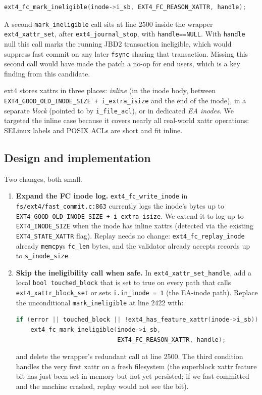 \documentclass[11pt,a4paper]{article}
\begin{document}
\begin{lstlisting}[language=C]
ext4_fc_mark_ineligible(inode->i_sb, EXT4_FC_REASON_XATTR, handle);
\end{lstlisting}

A second \texttt{mark\_ineligible} call sits at line 2500 inside
the wrapper \texttt{ext4\_xattr\_set}, after
\texttt{ext4\_journal\_stop}, with \texttt{handle==NULL}. With
\texttt{handle} null this call marks the running JBD2 transaction
ineligible, which would suppress fast commit on any later
\texttt{fsync} sharing that transaction. Missing this second call
would have made the patch a no-op for end users, which is a key
finding from this candidate.

ext4 stores xattrs in three places: \emph{inline} (in the inode
body, between \texttt{EXT4\_GOOD\_OLD\_INODE\_SIZE
+ i\_extra\_isize} and the end of the inode), in a separate
\emph{block} (pointed to by \texttt{i\_file\_acl}), or in
dedicated \emph{EA inodes}. We targeted the inline case because
it covers nearly all real-world xattr operations: SELinux labels
and POSIX ACLs are short and fit inline.

\subsection{Design and implementation}

Two changes, both small.

\begin{enumerate}[leftmargin=*]
  \item \textbf{Expand the FC inode log.}
        \texttt{ext4\_fc\_write\_inode} in
        \texttt{fs/ext4/fast\_commit.c:863} currently logs the
        inode's bytes up to
        \texttt{EXT4\_GOOD\_OLD\_INODE\_SIZE
        + i\_extra\_isize}. We extend it to log up to
        \texttt{EXT4\_INODE\_SIZE} when the inode has inline
        xattrs (detected via the existing
        \texttt{EXT4\_STATE\_XATTR} flag). Replay needs no
        change: \texttt{ext4\_fc\_replay\_inode} already
        \texttt{memcpy}s \texttt{fc\_len} bytes, and the
        validator already accepts records up to
        \texttt{s\_inode\_size}.
  \item \textbf{Skip the ineligibility call when safe.} In
        \texttt{ext4\_xattr\_set\_handle}, add a local
        \texttt{bool touched\_block} that is set to true on every
        path that calls \texttt{ext4\_xattr\_block\_set} or sets
        \texttt{i.in\_inode = 1} (the EA-inode path). Replace the
        unconditional \texttt{mark\_ineligible} at line 2422 with:
\begin{lstlisting}[language=C]
if (error || touched_block || !ext4_has_feature_xattr(inode->i_sb))
    ext4_fc_mark_ineligible(inode->i_sb,
                            EXT4_FC_REASON_XATTR, handle);
\end{lstlisting}
        and delete the wrapper's redundant call at line 2500. The
        third condition handles the very first xattr on a fresh
        filesystem (the superblock xattr feature bit has just
        been set in memory but not yet persisted; if we
        fast-committed and the machine crashed, replay would not
        see the bit).
\end{enumerate}
\end{document}
